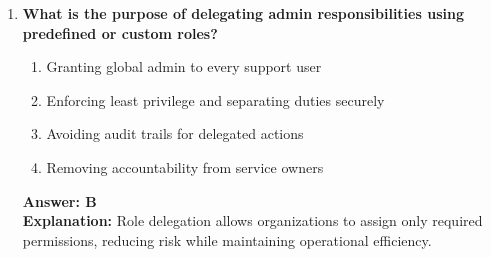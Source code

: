 \documentclass[10pt]{article}
\begin{document}
\begin{enumerate}[leftmargin=*]
\item \textbf{What is the purpose of delegating admin responsibilities using predefined or custom roles?}
\begin{enumerate}[label=\Alph*.]
  \item Granting global admin to every support user
  \item Enforcing least privilege and separating duties securely
  \item Avoiding audit trails for delegated actions
  \item Removing accountability from service owners
\end{enumerate}
\textbf{Answer: B}\\
\textbf{Explanation:} Role delegation allows organizations to assign only required permissions, reducing risk while maintaining operational efficiency.

\end{enumerate}
\clearpage
\end{document}
